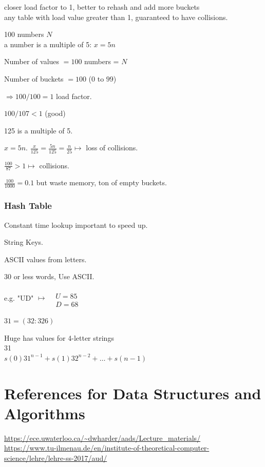 \documentclass[10pt]{amsart}
\begin{document}
\begin{multicols*}{2}
closer load factor to 1, better to rehash and add more buckets \\
any table with load value greater than 1, guaranteed to have collisions.

100 numbers $N$ \\
a number is a multiple of 5: $x = 5n$ 

Number of values $= 100$ numbers = $N$

Number of buckets $= 100$ ($0$ to $99$)

$\Longrightarrow 100/ 100 = 1$ load factor.

$100/107 < 1$ (good)

125 is a multiple of 5.

$x=5n$. $\frac{x}{125} = \frac{5n}{125} = \frac{n}{25} \mapsto $ loss of collisions.

$\frac{100}{87} > 1 \mapsto$ collisions.

$\frac{100}{1000} = 0.1$ but waste memory, ton of empty buckets.

\subsubsection{Hash Table}

Constant time lookup important to speed up.

String Keys.

ASCII values from letters.

30 or less words, Use ASCII. 

e.g. "UD" $\mapsto \begin{aligned} & \quad \\
& U = 85 \\
& D = 68 \end{aligned}$ 

$31 = (32 : 326)$ 

Huge has values for 4-letter strings \\
31 \\
$s(0) 31^{n-1} + s(1) 32^{n-2} + \dots + s(n-1)$

\section{References for Data Structures and Algorithms}

\url{https://ece.uwaterloo.ca/~dwharder/aads/Lecture_materials/} \\
\url{https://www.tu-ilmenau.de/en/institute-of-theoretical-computer-science/lehre/lehre-ss-2017/aud/}


\end{multicols*}
\end{document}
